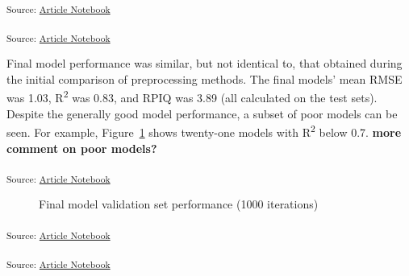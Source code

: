 \documentclass[
]{agujournal2019}
\begin{document}
\textsubscript{Source:
\href{https://rvcrawford.github.io/glowing-system/index.qmd.html}{Article
Notebook}}

\textsubscript{Source:
\href{https://rvcrawford.github.io/glowing-system/index.qmd.html}{Article
Notebook}}

Final model performance was similar, but not identical to, that obtained
during the initial comparison of preprocessing methods. The final
models' mean RMSE was 1.03, R\textsuperscript{2} was 0.83, and RPIQ was
3.89 (all calculated on the test sets). Despite the generally good model
performance, a subset of poor models can be seen. For example,
Figure~\ref{fig-final-metric-boxplot} shows twenty-one models with
R\textsuperscript{2} below 0.7. \textbf{more comment on poor models?}

\textsubscript{Source:
\href{https://rvcrawford.github.io/glowing-system/index.qmd.html}{Article
Notebook}}

\label{cell-fig-final-metric-boxplot}
\begin{figure}[H]


\caption{\label{fig-final-metric-boxplot}Final model validation set
performance (1000 iterations)}

\end{figure}%

\textsubscript{Source:
\href{https://rvcrawford.github.io/glowing-system/index.qmd.html}{Article
Notebook}}

\textsubscript{Source:
\href{https://rvcrawford.github.io/glowing-system/index.qmd.html}{Article
Notebook}}
\end{document}
